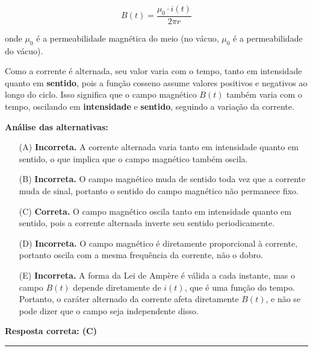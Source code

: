 \documentclass[a4paper,12pt]{article}
\begin{document}
\begin{flushleft}
\[
B(t) = \frac{\mu_0 \cdot i(t)}{2\pi r}
\]

onde \(\mu_0\) é a permeabilidade magnética do meio (no vácuo, \(\mu_0\) é a permeabilidade do vácuo).

\bigskip

Como a corrente é alternada, seu valor varia com o tempo, tanto em intensidade quanto em \textbf{sentido}, pois a função cosseno assume valores positivos e negativos ao longo do ciclo. Isso significa que o campo magnético \(B(t)\) também varia com o tempo, oscilando em \textbf{intensidade} e \textbf{sentido}, seguindo a variação da corrente.

\bigskip

\textbf{Análise das alternativas:}

\begin{itemize}
    \item[(A)] \textbf{Incorreta.} A corrente alternada varia tanto em intensidade quanto em sentido, o que implica que o campo magnético também oscila.
    
    \item[(B)] \textbf{Incorreta.} O campo magnético muda de sentido toda vez que a corrente muda de sinal, portanto o sentido do campo magnético não permanece fixo.
    
    \item[(C)] \textbf{Correta.} O campo magnético oscila tanto em intensidade quanto em sentido, pois a corrente alternada inverte seu sentido periodicamente.
    
    \item[(D)] \textbf{Incorreta.} O campo magnético é diretamente proporcional à corrente, portanto oscila com a mesma frequência da corrente, não o dobro.
    
    \item[(E)] \textbf{Incorreta.} A forma da Lei de Ampère é válida a cada instante, mas o campo \(B(t)\) depende diretamente de \(i(t)\), que é uma função do tempo. Portanto, o caráter alternado da corrente afeta diretamente \(B(t)\), e não se pode dizer que o campo seja independente disso.
\end{itemize}

\bigskip

\textbf{Resposta correta: \colorbox{green!50}{(C)}}

\end{flushleft}

\noindent\rule{\linewidth}{0.6pt}\\
\end{document}
